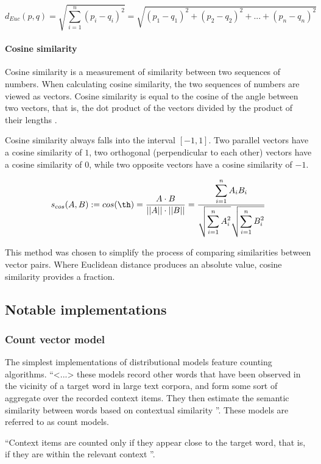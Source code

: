 \documentclass[14pt, a4paper]{extreport}
\begin{document}
\medskip
\[d_{Euc}(p, q) = \sqrt{\displaystyle\sum_{i=1}^{n} (p_i - q_i)^2} = \sqrt{(p_1 - q_1)^2 + (p_2 - q_2)^2 + ... + (p_n - q_n)^2}\]

\paragraph{Cosine similarity}

Cosine similarity is a measurement of similarity between two sequences of numbers. When calculating cosine similarity, the two sequences of numbers are viewed as vectors. Cosine similarity is equal to the cosine of the angle between two vectors, that is, the dot product of the vectors divided by the product of their lengths \parencite{oduntan}.

Cosine similarity always falls into the interval \([-1, 1]\). Two parallel vectors have a cosine similarity of \(1\), two orthogonal (perpendicular to each other) vectors have a cosine similarity of \(0\), while two opposite vectors have a cosine similarity of \(-1\).

\medskip
\[s_{cos}(A, B) := cos(\th) = \frac {A \cdot B}{||A|| \cdot ||B||} = \frac {\displaystyle\sum_{i=1}^{n} A_i B_i}{\sqrt{\displaystyle\sum_{i=1}^{n} A_i^2} \sqrt{\displaystyle\sum_{i=1}^{n} B_i^2}}\]
\medskip

This method was chosen to simplify the process of comparing similarities between vector pairs. Where Euclidean distance produces an absolute value, cosine similarity provides a fraction.
    \subsection{Notable implementations}
      \subsubsection{Count vector model}
The simplest implementations of distributional models feature counting algorithms. ``<...> these models record other words that have been observed in the vicinity of a target word in large text corpora, and form some sort of aggregate over the recorded context items. They then estimate the semantic similarity between words based on contextual similarity \parencite{erkkatrin2}''. These models are referred to as count models.

``Context items are counted only if they appear close to the target word, that is, if they are within the relevant context \parencite{erkkatrin2}''.
\end{document}

